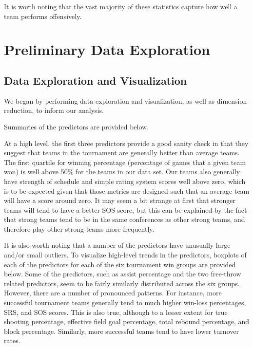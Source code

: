 \documentclass[10pt,a4paper, hidelinks]{article} %
\begin{document}
It is worth noting that the vast majority of these statistics capture how well a team performs offensively.  

\section{Preliminary Data Exploration}

\subsection{Data Exploration and Visualization}
We began by performing data exploration and visualization, as well as dimension reduction, to inform our analysis.

Summaries of the predictors are provided below.


At a high level, the first three predictors provide a good sanity check in that they suggest that  teams in the tournament are generally better than average teams. The first quartile for winning percentage (percentage of games that a given team won) is well above 50\% for the teams in our data set. Our teams also generally have strength of schedule and simple rating system scores well above zero, which is to be expected given that those metrics are designed such that an average team will have a score around zero. It may seem a bit strange at first that stronger teams will tend to have a better SOS score, but this can be explained by the fact that strong teams tend to be in the same conferences as other strong teams, and therefore play other strong teams more frequently.

It is also worth noting that a number of the predictors have unusually large and/or small outliers. To visualize high-level trends in the predictors, boxplots of each of the predictors for each of the six tournament win groups are provided below. Some of the predictors, such as assist percentage and the two free-throw related predictors, seem to be fairly similarly distributed across the six groups. However, there are a number of pronounced patterns. For instance, more successful tournament teams generally tend to much higher win-loss percentages, SRS, and SOS scores. This is also true, although to a lesser extent for true shooting percentage, effective field goal percentage, total rebound percentage, and block percentage. Similarly, more successful teams tend to have lower turnover rates. 
\end{document}
